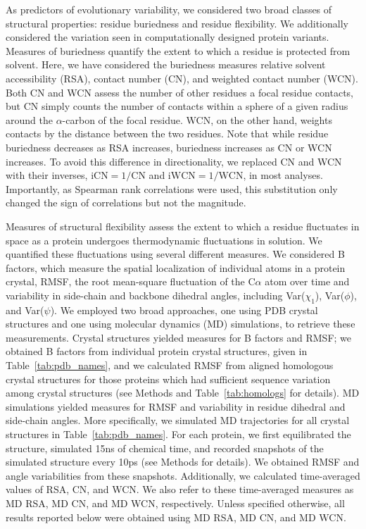 \documentclass[smallextended]{svjour3}
\begin{document}
{\color{red}As predictors of evolutionary variability, we considered two broad classes of structural properties: residue buriedness and residue flexibility. We additionally considered the variation seen in computationally designed protein variants. Measures of buriedness quantify the extent to which a residue is protected from solvent. Here, we have considered the buriedness measures relative solvent accessibility (RSA), contact number (CN), and weighted contact number (WCN). Both CN and WCN assess the number of other residues a focal residue contacts, but CN simply counts the number of contacts within a sphere of a given radius around the $\alpha$-carbon of the focal residue. WCN, on the other hand, weights contacts by the distance between the two residues. Note that while residue buriedness decreases as RSA increases, buriedness increases as CN or WCN increases. To avoid this difference in directionality, we replaced CN and WCN with their inverses, $\text{iCN}=1/\text{CN}$ and $\text{iWCN}=1/\text{WCN}$, in most analyses. Importantly, as Spearman rank correlations were used, this substitution only changed the sign of correlations but not the magnitude.}

Measures of structural flexibility assess the extent to which a residue fluctuates in space as a protein undergoes thermodynamic fluctuations in solution. We quantified these fluctuations using several different measures. We considered B factors, which measure the spatial localization of individual atoms in a protein crystal, RMSF, the root mean-square fluctuation of the C$\alpha$ atom over time and variability in side-chain and backbone dihedral angles, including Var($\chi_1$), Var($\phi$), and Var($\psi$). We employed two broad approaches, one using PDB crystal structures and one using molecular dynamics (MD) simulations, to retrieve these measurements. Crystal structures yielded measures for B factors and RMSF; we obtained B factors from individual protein crystal structures, given in Table~\ref{tab:pdb_names}, and we calculated RMSF from aligned homologous crystal structures for those proteins which had sufficient sequence variation among crystal structures (see Methods and Table~\ref{tab:homologs} for details). MD simulations yielded measures for RMSF and variability in residue dihedral and side-chain angles. More specifically, we simulated MD trajectories for all crystal structures in Table~\ref{tab:pdb_names}. For each protein, we first equilibrated the structure, simulated 15ns of chemical time, and recorded snapshots of the simulated structure every 10ps (see Methods for details). We obtained RMSF and angle variabilities from these snapshots. Additionally, we calculated time-averaged values of RSA, CN, and WCN. We also refer to these time-averaged measures as MD RSA, MD CN, and MD WCN, respectively. Unless specified otherwise, all results reported below were obtained using MD RSA, MD CN, and MD WCN.
\end{document}
